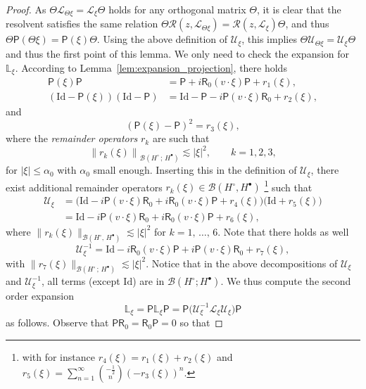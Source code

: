 \documentclass[10pt]{amsart}
\theoremstyle{definition}\newtheorem{defi}[theo]{Definition}\newtheorem{rema}[theo]{Remark}\newtheorem{exam}[theo]{Example}\newtheorem{exem}[theo]{Example}\newtheorem{nota}[theo]{Notation}
\newcommand{\Id}{\mathrm{Id}}
\newcommand{\sfR}{\mathsf{R}}
\newcommand{\rectL}{\mathbb{L}}
\newcommand{\LL}{\mathcal{L}}
\newcommand{\PP}{\mathsf{P}}
\newcommand{\RR}{\mathcal{R}}
\newcommand{\UU}{\mathcal{U}}
\newcommand{\BBB}{\mathscr{B}}
\newcommand{\Ssp}{H^{\bullet}}
\newcommand{\Ssm}{H^{\circ}}
\renewcommand*\le{\leqslant}
\begin{document}
\begin{proof}
As $\Theta \LL_{\Theta \xi} = \LL_\xi \Theta$ holds for any orthogonal matrix $\Theta$, it is clear that the resolvent satisfies the same relation $\Theta \RR(z, \LL_{\Theta \xi})= \RR(z,\LL_\xi)\Theta$, and thus $\Theta \PP(\Theta \xi) = \PP(\xi) \Theta$. Using the above definition of $\UU_{\xi}$, this implies $\Theta \UU_{\Theta \xi} = \UU_{\xi} \Theta$ and thus the first point of this lemma. We only need to check the expansion for $\rectL_{ \xi}$. According to Lemma~\ref{lem:expansion_projection}, there holds
\begin{align*}
\PP(\xi) \PP &= \PP +i \sfR_{0} (v \cdot \xi) \PP + r_{1}(\xi), \\
(\Id - \PP(\xi))(\Id - \PP) &= \Id - \PP - i \PP (v \cdot \xi) \sfR_{0} + r_{2}(\xi),
\end{align*}
and
\[
(\PP(\xi) - \PP)^2=r_{3}(\xi),
\]
where the \emph{remainder operators} $r_{k}$ are such that
\[
\left\|r_{k}(\xi)\right\|_{\BBB(\Ssm\,;\,\Ssp)} \lesssim |\xi|^{2}, \qquad k=1,2,3,
\]
for $|\xi| \le \alpha_0$ with $\alpha_0$ small enough. Inserting this in the definition of $\UU_{\xi}$, there exist additional remainder operators $r_{k}(\xi) \in \BBB(\Ssm,\Ssp)$ \footnote{with for instance $r_{4}(\xi)=r_{1}(\xi)+r_{2}(\xi)$ and $r_{5}(\xi)=\sum_{n=1}^{\infty}\binom{-\frac{1}{2}}{n}(-r_{3}(\xi))^{n}.$} such that
\begin{equation}\label{eq:expansion_Kato_isomorphism}
\begin{split}
\UU_\xi & = \Big(\Id - i \PP (v \cdot \xi)\sfR_{0} + i\sfR_{0} (v \cdot \xi) \PP + r_{4}(\xi) \Big) \Big(\Id + r_{5}(\xi) \Big) \\
& = \Id - i \PP (v \cdot \xi)\sfR_{0} + i\sfR_{0} (v \cdot \xi) \PP + r_{6}(\xi),
\end{split}
\end{equation}
where $\|r_{k}(\xi)\|_{\BBB(\Ssm,\,\Ssp)} \lesssim |\xi|^{2}$ for $k=1,\,\ldots,\,6$. Note that there holds as well
\begin{equation*}\label{eq:expansion_Kato_isomorphism_inverse}
\UU^{-1}_\xi = \Id - i\sfR_{0} (v \cdot \xi) \PP + i \PP (v \cdot \xi)\sfR_{0} + r_{7}(\xi),
\end{equation*}
with $\|r_{7}(\xi)\|_{\BBB(\Ssm\,;\,\Ssp)} \lesssim |\xi|^{2}.$ Notice that in the above decompositions of $\UU_{\xi}$ and $\UU_{\xi}^{-1}$, all terms (except $\Id$) are in $\BBB(\Ssm ; \Ssp)$. We thus compute the second order expansion
\[
\rectL_\xi =\PP \rectL_\xi \PP=\PP \Big(\UU^{-1}_\xi \LL_\xi \UU_\xi\Big) \PP
\]
as follows. Observe that $\PP \sfR_{0}=\sfR_{0}\PP=0$ so that

\end{proof}
\end{document}
